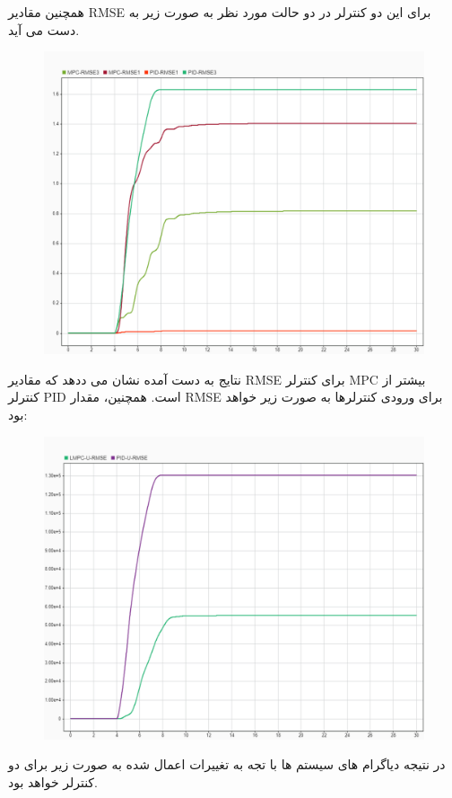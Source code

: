 همچنین مقادیر RMSE برای این دو کنترلر در دو حالت مورد نظر به صورت زیر به دست می آید.

\begin{figure}[H]
	\centering
	\includegraphics[width=1\linewidth]{../img/15}
	\caption{}
	\label{fig:15}
\end{figure}
نتایج به دست آمده نشان می ددهد که مقادیر RMSE برای کنترلر MPC بیشتر از کنترلر PID است. 
همچنین، مقدار RMSE برای ورودی کنترلرها به صورت زیر خواهد بود:

\begin{figure}[H]
	\centering
	\includegraphics[width=1\linewidth]{../img/16}
	\caption{}
	\label{fig:16}
\end{figure}
در نتیجه دیاگرام های سیستم ها با تجه به تغییرات اعمال شده به صورت زیر برای دو کنترلر خواهد بود.

